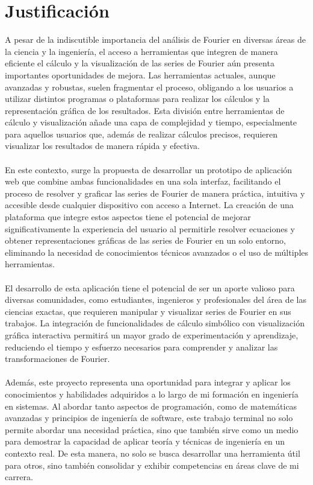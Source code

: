 \section{Justificación}
A pesar de la indiscutible importancia del análisis de Fourier en diversas áreas de la ciencia y la ingeniería, el acceso a herramientas que integren de manera eficiente el cálculo y la visualización de las series de Fourier aún presenta importantes oportunidades de mejora. Las herramientas actuales, aunque avanzadas y robustas, suelen fragmentar el proceso, obligando a los usuarios a utilizar distintos programas o plataformas para realizar los cálculos y la representación gráfica de los resultados. Esta división entre herramientas de cálculo y visualización añade una capa de complejidad y tiempo, especialmente para aquellos usuarios que, además de realizar cálculos precisos, requieren visualizar los resultados de manera rápida y efectiva.\\\\
En este contexto, surge la propuesta de desarrollar un prototipo de aplicación web que combine ambas funcionalidades en una sola interfaz, facilitando el proceso de resolver y graficar las series de Fourier de manera práctica, intuitiva y accesible desde cualquier dispositivo con acceso a Internet. La creación de una plataforma que integre estos aspectos tiene el potencial de mejorar significativamente la experiencia del usuario al permitirle resolver ecuaciones y obtener representaciones gráficas de las series de Fourier en un solo entorno, eliminando la necesidad de conocimientos técnicos avanzados o el uso de múltiples herramientas. \\\\
El desarrollo de esta aplicación tiene el potencial de ser un aporte valioso para diversas comunidades, como estudiantes, ingenieros y profesionales del área de las ciencias exactas, que requieren manipular y visualizar series de Fourier en sus trabajos. La integración de funcionalidades de cálculo simbólico con visualización gráfica interactiva permitirá un mayor grado de experimentación y aprendizaje, reduciendo el tiempo y esfuerzo necesarios para comprender y analizar las transformaciones de Fourier. \\\\
Además, este proyecto representa una oportunidad para integrar y aplicar los conocimientos y habilidades adquiridos a lo largo de mi formación en ingeniería en sistemas. Al abordar tanto aspectos de programación, como de matemáticas avanzadas y principios de ingeniería de software, este trabajo terminal no solo permite abordar una necesidad práctica, sino que también sirve como un medio para demostrar la capacidad de aplicar teoría y técnicas de ingeniería en un contexto real. De esta manera, no solo se busca desarrollar una herramienta útil para otros, sino también consolidar y exhibir competencias en áreas clave de mi carrera.

